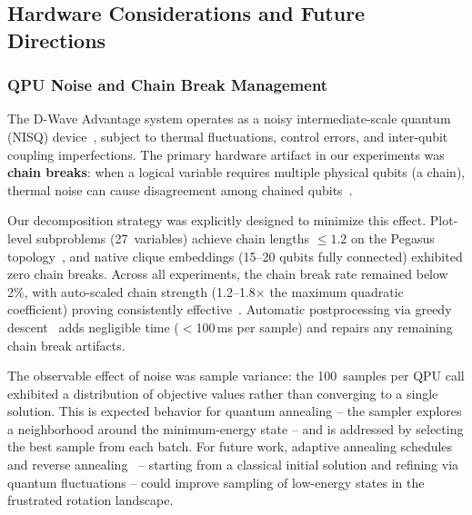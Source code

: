 \documentclass{oqireport}
\begin{document}

\subsection{Hardware Considerations and Future Directions}
\label{subsec:hardware_future}

\subsubsection{QPU Noise and Chain Break Management}

The D-Wave Advantage system operates as a noisy intermediate-scale quantum (NISQ) device~\cite{preskillQuantumComputingNISQ2018, boothby2020next}, subject to thermal fluctuations, control errors, and inter-qubit coupling imperfections. The primary hardware artifact in our experiments was \textbf{chain breaks}: when a logical variable requires multiple physical qubits (a chain), thermal noise can cause disagreement among chained qubits~\cite{choi2008minor}.

Our decomposition strategy was explicitly designed to minimize this effect. Plot-level subproblems (27~variables) achieve chain lengths $\leq 1.2$ on the Pegasus topology~\cite{boothby2020next}, and native clique embeddings (15--20 qubits fully connected) exhibited zero chain breaks. Across all experiments, the chain break rate remained below 2\%, with auto-scaled chain strength (1.2--1.8$\times$ the maximum quadratic coefficient) proving consistently effective~\cite{venturelli2015quantum}. Automatic postprocessing via greedy descent~\cite{cai2014practical} adds negligible time ($<$100\,ms per sample) and repairs any remaining chain break artifacts.

The observable effect of noise was sample variance: the 100~samples per QPU call exhibited a distribution of objective values rather than converging to a single solution. This is expected behavior for quantum annealing -- the sampler explores a neighborhood around the minimum-energy state -- and is addressed by selecting the best sample from each batch. For future work, adaptive annealing schedules~\cite{marshall2019power, king2022coherent} and reverse annealing~\cite{venturelli2019reverse} -- starting from a classical initial solution and refining via quantum fluctuations -- could improve sampling of low-energy states in the frustrated rotation landscape.
\end{document}
